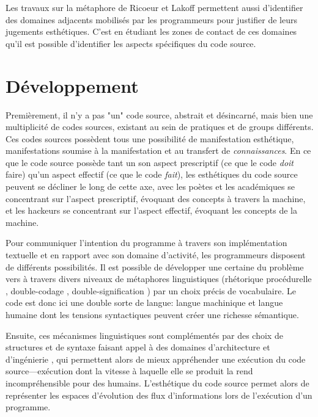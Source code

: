 \documentclass{article}
\begin{document}
Les travaux sur la métaphore de Ricoeur et Lakoff permettent aussi d'identifier des domaines adjacents mobilisés par les programmeurs pour justifier de leurs jugements esthétiques. C'est en étudiant les zones de contact de ces domaines qu'il est possible d'identifier les aspects spécifiques du code source.

\section{Développement}

Premièrement, il n'y a pas "un" code source, abstrait et désincarné, mais bien une multiplicité de codes sources, existant au sein de pratiques et de groups différents. Ces codes sources possèdent tous une possibilité de manifestation esthétique, manifestations soumise à la manifestation et au transfert de \emph{connaissances}. En ce que le code source possède tant un son aspect prescriptif (ce que le code \emph{doit} faire) qu'un aspect effectif (ce que le code \emph{fait}), les esthétiques du code source peuvent se décliner le long de cette axe, avec les poètes et les académiques se concentrant sur l'aspect prescriptif, évoquant des concepts à travers la machine, et les hackeurs se concentrant sur l'aspect effectif, évoquant les concepts de la machine.

Pour communiquer l'intention du programme à travers son implémentation textuelle et en rapport avec son domaine d'activité, les programmeurs disposent de différents possibilités. Il est possible de développer une certaine du problème vers à travers divers niveaux de métaphores linguistiques (rhétorique procédurelle \citep{bogost_rhetoric_2008}, double-codage \citep{cox_speaking_2013}, double-signification \citep{paloque-berges_poetique_2009}) par un choix précis de vocabulaire. Le code est donc ici une double sorte de langue: langue machinique et langue humaine dont les tensions syntactiques peuvent créer une richesse sémantique.

Ensuite, ces mécanismes linguistiques sont complémentés par des choix de structures et de syntaxe faisant appel à des domaines d'architecture et d'ingénierie \citep{gabriel_patterns_1998,schummer_aesthetic_2009}, qui permettent alors de mieux appréhender une exécution du code source—exécution dont la vitesse à laquelle elle se produit la rend incompréhensible pour des humains. L'esthétique du code source permet alors de représenter les espaces d'évolution des flux d'informations lors de l'exécution d'un programme.
\end{document}
